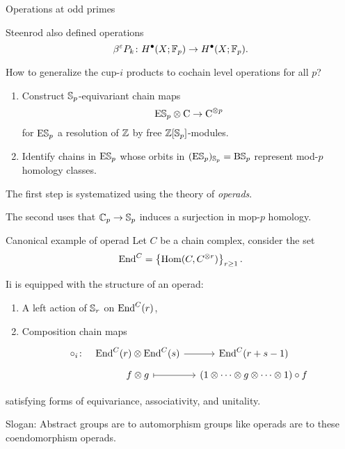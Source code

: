 
\begin{frame}{Operations at odd primes}

	Steenrod also defined operations
	\[
	\beta^{\varepsilon} P_k \colon H^\bullet(X; {\mathbb{F}_p}) \to H^\bullet(X; {\mathbb{F}_p}).
	\]

	\pause How to generalize the cup-$i$ products to cochain level operations for all $p$?

	\smallskip \pause
	\begin{enumerate}
		\item Construct $\mathbb{S}_p$-equivariant chain maps
		\[
		\mathrm{E} \mathbb{S}_p \otimes \operatorname{C} \to \operatorname{C}^{\otimes p}
		\]
		for $\mathrm{E} \mathbb{S}_p$ a resolution of $\mathbb{Z}$ by free $\mathbb{Z}[\mathbb{S}_p]$-modules.
		\vspace*{10pt} \pause
		\item Identify chains in $\mathrm{E} \mathbb{S}_p$ whose orbits in $(\mathrm{E} \mathbb{S}_p)_{\mathbb{S}_p} = \mathrm{B} \mathbb{S}_p$ represent mod-$p$ homology classes.
	\end{enumerate}

	\medskip \pause	The first step is systematized using the theory of \textit{operads}.

	\smallskip \pause The second uses that $\mathbb{C}_p \to \mathbb{S}_p$ induces a surjection in mop-$p$ homology.
\end{frame}

\begin{frame}[fragile]{Canonical example of operad}
	\pause Let $C$ be a chain complex, consider the set
	\[
	\mathrm{End}^C = \left\{ \mathrm{Hom}(C, C^{\otimes r}) \right\}_{r \geq 1}.
	\]

	\pause	Ii is equipped with the structure of an operad:
	\begin{enumerate}
		\item A left action of $\mathbb{S}_r$ on $\mathrm{End}^C(r)$, \pause
		\item Composition chain maps
		\[
		\begin{tikzcd}[column sep=small, row sep=tiny]
			\circ_i \colon &[-10pt] \End^C(r) \otimes \End^C(s) \arrow[r] & \End^C(r+s-1) \\
			& f \otimes g \arrow[r, |->] & (1 \otimes \cdots \otimes g \otimes \cdots \otimes 1) \circ f
		\end{tikzcd}
		\]
	\end{enumerate}
	satisfying forms of equivariance, associativity, and unitality.

	\pause \vspace*{10pt}

	\textcolor{pblue}{Slogan:} Abstract groups are to automorphism groups like operads are to these coendomorphism operads.
\end{frame}

